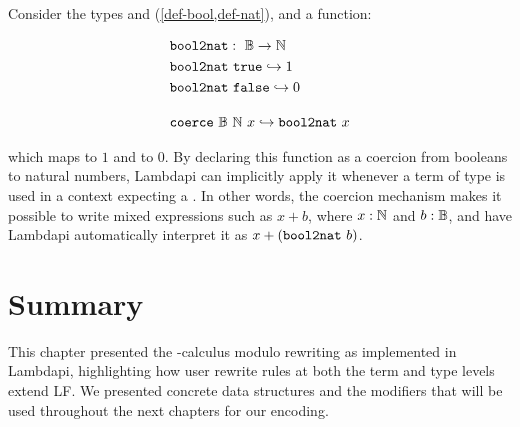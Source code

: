 \begin{example}
Consider the types {\B} and {\N} (\cref{def-bool,def-nat}), and a function:

\begin{align*}
&\texttt{\upshape{bool2nat}}:~\mathbb{B} \rightarrow \mathbb{N} \\
&\texttt{\upshape{bool2nat}}~\texttt{\upshape{true}} \hookrightarrow 1 \\
&\texttt{\upshape{bool2nat}}~\texttt{\upshape{false}} \hookrightarrow 0\\[1em]
&\texttt{\upshape{coerce}}~\mathbb{B}~\mathbb{N}~x \hookrightarrow \texttt{\upshape{bool2nat}}~x 
\end{align*}

which maps {\true} to $1$ and {\false} to $0$.
By declaring this function as a coercion from booleans to natural numbers, Lambdapi can implicitly apply it whenever a term of type {\B} is used in a context expecting a \N.
In other words, the coercion mechanism makes it possible to write mixed expressions such as $x + b$, where $x : \mathbb{N}$ and $b : \mathbb{B}$, and have Lambdapi automatically interpret it as $x + (\texttt{\upshape{bool2nat}}~b)$.
\end{example}

\section*{Summary}

This chapter presented the \lp{}-calculus modulo rewriting as implemented in Lambdapi, highlighting how user rewrite rules at both the term and type levels extend LF.
We presented concrete data structures and the modifiers that will be used throughout the next chapters for our encoding.